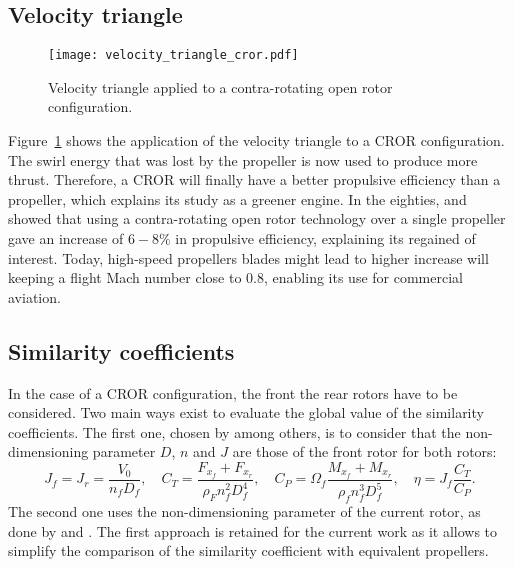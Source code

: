\subsection{Velocity triangle}
\label{sub:cror_velocity_triangle}
\begin{figure}[htp]
  \centering
  \texttt{[image: velocity\_triangle\_cror.pdf]}
  \caption{Velocity triangle applied to a contra-rotating open rotor configuration.}
  \label{fig:velocity_triangle_cror}
\end{figure}
Figure~\ref{fig:velocity_triangle_cror} shows the application
of the velocity triangle to a CROR configuration. The swirl
energy that was lost by the propeller is now used to 
produce more thrust. Therefore, a CROR will finally have a better propulsive
efficiency than a propeller, which explains its study as
a greener engine. In the eighties, 
\citet{Strack1981} and \citet{Hager1988} showed that
using a contra-rotating open rotor technology over
a single propeller gave an increase of $6-8\%$
in propulsive efficiency, explaining its regained of interest.
Today, high-speed propellers blades might lead to higher increase
will keeping a flight Mach number close to $0.8$, enabling its use
for commercial aviation.

\subsection{Similarity coefficients}
\label{sub:cror_similarity_coeff}

In the case of a CROR configuration, the front the rear rotors 
have to be considered.
Two main ways exist to evaluate the global value of the
similarity coefficients. The first one, chosen by
\citet{Bechet2011} among others, is to consider
that the non-dimensioning parameter $D$, $n$ and $J$ are those
of the front rotor for both rotors:
\begin{equation}
    J_f = J_r = \frac{V_0}{n_f D_f}, \quad
    C_T = \frac{F_{x_f} + F_{x_r}}{\rho_F n_f ^ 2  D_f ^ 4}, \quad
    C_P = \Omega_f \frac{M_{x_f} + M_{x_r}}{\rho_f n_f ^ 3 D_f ^ 5}, \quad
    \eta = J_f \frac{C_T}{C_P}.
\end{equation} 
The second one uses the non-dimensioning parameter of the current rotor,
as done by \citet{Stuermer2008} and \citet{Zachariadis2011}.
The first approach is retained for the current work as it allows
to simplify the comparison of the similarity coefficient with equivalent propellers.
